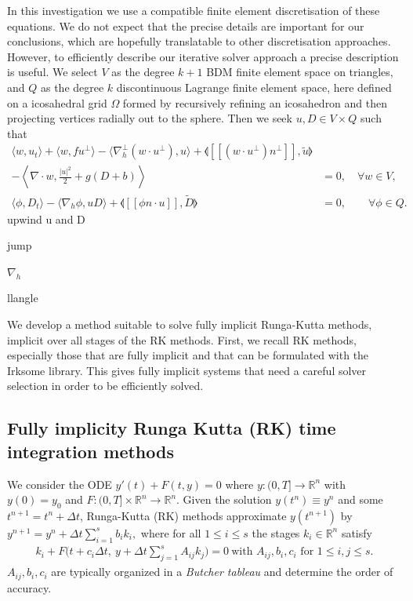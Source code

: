 \documentclass[a4paper,10pt]{article}
\newcommand{\jump}[1]{[\![#1]\!]}
\begin{document}
In this investigation we use a compatible finite element
discretisation of these equations. We do not expect that the precise
details are important for our conclusions, which are hopefully
translatable to other discretisation approaches. However, to
efficiently describe our iterative solver approach a precise
description is useful. We select $V$ as the degree $k+1$ BDM finite
element space on triangles, and $Q$ as the degree $k$ discontinuous
Lagrange finite element space, here defined on a icosahedral grid
$\Omega$ formed by recursively refining an icosahedron and then projecting
vertices radially out to the sphere. Then we seek $u,D\in V\times Q$
such that
\begin{align}
  \langle w, u_t \rangle + \langle w, fu^\perp \rangle 
  - \langle \nabla_h^\perp (w\cdot u^\perp), u \rangle
  + \llangle \jump{(w\cdot u^\perp) n^\perp}, \tilde{u} \rrangle \nonumber & \\
  - \left\langle \nabla\cdot w, \frac{|u|^2}{2} + g(D+b) \right\rangle  & = 0,
  \quad \forall w \in V, \\
  \langle \phi, D_t \rangle - \langle \nabla_h \phi, uD \rangle
  + \llangle \jump{\phi n\cdot u}, \tilde{D} \rrangle & =
 0, \qquad \forall \phi \in Q.
\end{align}
upwind u and D

jump

$\nabla_h$

llangle 

We develop a method suitable to solve fully implicit Runga-Kutta
methods, implicit over all stages of the RK methods. First, we recall
RK methods, especially those that are fully implicit and that can be
formulated with the Irksome library. This gives fully implicit systems
that need a careful solver selection in order to be efficiently
solved.


\subsection{Fully implicity Runga Kutta (RK) time integration methods}

We consider the ODE $y'(t) + F(t,y)= 0$ where $y:(0,T] \rightarrow \mathbb{R}^n$ with $y(0) = y_0$
and $F:(0,T]\times \mathbb{R}^n \rightarrow \mathbb{R}^n$.
Given the solution
$y(t^n)\equiv y^n$ and some $t^{n+1} = t^n + \Delta t$, Runga-Kutta (RK) methods approximate $y(t^{n+1})$ by
$y^{n+1} = y^{n} + \Delta t \sum_{i = 1}^{s} b_i k_i,$ where for all $1\leq i \leq s$
 the stages $k_i \in \mathbb{R}^n$ satisfy
\begin{align*}
 k_i + F\Big(t + c_i \Delta t, \  y + \Delta t \sum_{j = 1}^{s} A_{ij} k_j \Big) = 0 \
 \text{with $A_{ij}, b_i, c_i$ for $1\leq i,j\leq s$.}
\end{align*}
$A_{ij}, b_i, c_i$ are typically organized in a \emph{Butcher tableau} and determine the order of accuracy.
\end{document}

